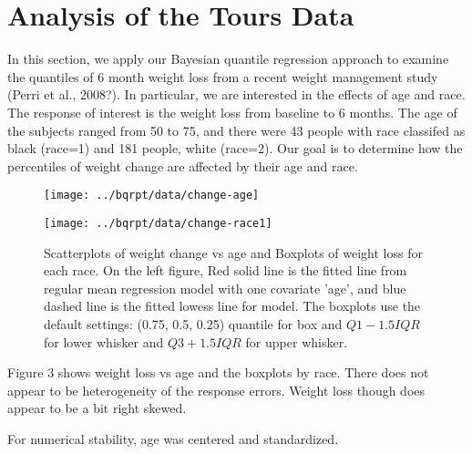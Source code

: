 \documentclass[12pt]{article}
\begin{document}
\section{Analysis of the Tours Data}
In this section, we apply our Bayesian quantile
regression approach to examine the quantiles of 6 month weight loss from a recent
weight management study (Perri et al., 2008?).  In particular, we are
interested in the effects of age and race.  
The response of interest is the  weight loss
from  baseline to  6 months. The age of
the subjects ranged from 50 to 75, and there were 43 people with race
classifed as 
black (race=1) and 181 people, white (race=2).
Our goal is to determine how  the percentiles of weight change
are affected by their age and race.

\begin{figure}[h]
  \begin{minipage}{0.5\linewidth}
    \centerline{\texttt{[image: ../bqrpt/data/change-age]}}
  \end{minipage}
  \begin{minipage}{0.5\linewidth}
    \centerline{\texttt{[image: ../bqrpt/data/change-race1]}}
  \end{minipage}

  \caption[]{\label{fig:tours} Scatterplots of weight change vs age and
    Boxplots of weight loss for each race. On the left figure, Red
    solid line is the   fitted line from regular mean regression model
    with one covariate   'age', and blue dashed line is the fitted
    lowess line for model.  The 
    boxplots use the default settings: (0.75, 0.5, 0.25) quantile for
    box and $Q1-1.5IQR$ for lower whisker and $Q3+1.5IQR$ for upper
    whisker. }
\end{figure}

Figure 3 shows  weight loss vs age and the boxplots by race.
There does not appear to be 
heterogeneity of the response errors. Weight loss though does appear
to be a bit right
skewed. 

For numerical stability, 
age was centered and standardized.
\end{document}

